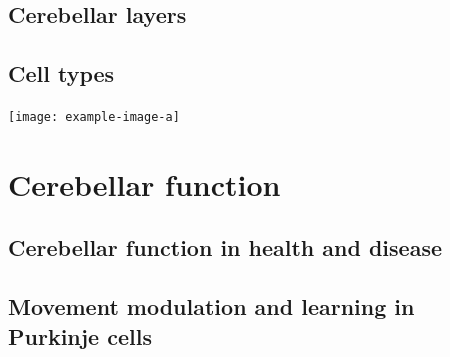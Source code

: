 \subsection{Cerebellar layers}
\label{sub:cb_layers}

\subsection{Cell types}
\texttt{[image: example-image-a]}

\section{Cerebellar function}
\label{sec:cb_function}

\subsection{Cerebellar function in health and disease}
\subsection{Movement modulation and learning in Purkinje cells}





